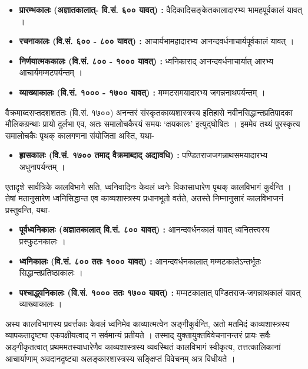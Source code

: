 \documentclass[10pt, a5paper, twoside]{article}
\begin{document}
\begin{itemize}
\item \textbf{प्रारम्भकालः (अज्ञातकालात्- वि.सं. ६०० यावत्) :} वैदिकादिसङ्केतकालादारभ्य भामहपूर्वकालं यावत् ।


\item \textbf{रचनाकालः (वि.सं. ६०० - ८०० यावत्) :} आचार्यभामहादारभ्य आनन्दवर्धनाचार्यपूर्वकालं यावत् ।


\item \textbf{निर्णयात्मककालः (वि.सं. ८०० - १००० यावत्) :} ध्वनिकाराद् आनन्दवर्धनाचार्यात् आरभ्य आचार्यमम्मटपर्यन्तम् ।


\item \textbf{व्याख्याकालः (वि.सं. १००० - १७०० यावत्) :} मम्मटसमयादारभ्य जगन्ननाथपर्यन्तम् ।


\end{itemize}
वैक्रमाब्दसप्तदशशततः (वि.सं. १७००) अनन्तरं संस्कृतकाव्यशास्त्रस्य इतिहासे नवीनसिद्धान्तप्रतिपादका मौलिकग्रन्थाः प्रायो दुर्लभा एव, अतः समालोचकैरयं समयः `क्षयकालः' इत्युद्घोषितः । इममेव तथ्यं पुरस्कृत्य समालोचकैः पृथक् कालगणना संयोजिता अस्ति, यथा-

\begin{itemize}
\item \textbf{ह्रासकालः (वि.सं. १७०० तमाद् वैक्रमाब्दाद् अद्यावधि) :} पण्डितराजजगन्नाथसमयादारभ्य अधुनापर्यन्तम् ।


\end{itemize}
एतादृशे सार्वत्रिके कालविभागे सति, ध्वनिवादिनः केवलं ध्वनेः विकासाधारेण पृथक् कालविभागं कुर्वन्ति । तेषां मतानुसारेण ध्वनिसिद्धान्त एव काव्यशास्त्रस्य प्रधानभूतो वर्तते, अतस्ते निम्नानुसारं कालविभाजनं प्रस्तुवन्ति, यथा-

\begin{itemize}
\item \textbf{पूर्वध्वनिकालः (अज्ञातकालात् वि.सं. ८०० यावत्) :} आनन्दवर्धनकालं यावत् ध्वनितत्त्वस्य प्रस्फुटनकालः ।


\item \textbf{ध्वनिकालः (वि.सं. ८०० ततः १००० यावत्) :} आनन्दवर्धनकालात् मम्मटकालेऽन्तर्भूतः सिद्धान्तप्रतिष्ठाकालः ।


\item \textbf{पश्चाद्ध्वनिकालः (वि.सं. १००० ततः १७०० यावत्) :} मम्मटकालात् पण्डितराज-जगन्नाथकालं यावत् व्याख्याकालः ।


\end{itemize}
अस्य कालविभागस्य प्रवर्त्तकाः केवलं ध्वनिमेव काव्यात्मत्वेन अङ्गीकुर्वन्ति, अतो मतमिदं काव्यशास्त्रस्य व्यापकतादृष्ट्या एकपक्षीयत्वाद् न सर्वमान्यं प्रतीयते । तस्माद् युक्तायुक्तविवेचनानन्तरं प्रायः सर्वैः अङ्गीकृतत्वात् प्रथममतस्याधारेणैव काव्यशास्त्रस्य व्यवस्थितं कालविभागं स्वीकृत्य, तत्तत्कालिकानां आचार्याणाम् अवदानदृष्ट्या अलङ्कारशास्त्रस्य सङ्क्षिप्तं विवेचनम् अत्र विधीयते ।
\end{document}
